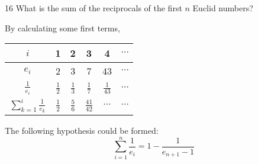 \documentclass[a4paper,12pt]{article}
\makeatletter
\newtheorem*{solution}{Solution}
\theoremstyle{definition}
\renewenvironment{solution}[1][Solution] {\par\pushQED{\qed}\normalfont\topsep6\p@\@plus6\p@\relax\trivlist\item[\hskip\labelsep\bfseries#1\@addpunct{.}]\ignorespaces}{\popQED\endtrivlist\@endpefalse} \makeatother
\newenvironment{problems}{\begin{list}{}{\renewcommand{\makelabel}[1]{\textbf{##1}\hfil}}}{\end{list}}
\makeatother
\begin{document}
\begin{problems}
    \item[16]What is the sum of the reciprocals of the first $n$ Euclid numbers?
    \begin{solution}
        By calculating some first terms,
        
        \begin{tabular}{c|ccccc}
            $i$ & 1 & 2 & 3 & 4 & $\cdots$ \\
            \hline
            $e_i$ & 2 & 3 & 7 & 43 & $\cdots$ \\
            $\frac{1}{e_i}$ & $\frac{1}{2}$ & $\frac{1}{3}$ & $\frac{1}{7}$ & $\frac{1}{43}$ & $\cdots$ \\
            $\sum_{k=1}^i \frac{1}{e_k}$ & $\frac{1}{2}$ & $\frac{5}{6}$ & $\frac{41}{42}$ & $\cdots$ & $\cdots$
        \end{tabular}

        The following hypothesis could be formed:
        \begin{equation}\label{eq:ass}
            \sum_{i=1}^n \frac{1}{e_i} = 1 - \frac{1}{e_{n+1}-1}
        \end{equation}


\end{solution}
\end{problems}
\end{document}
